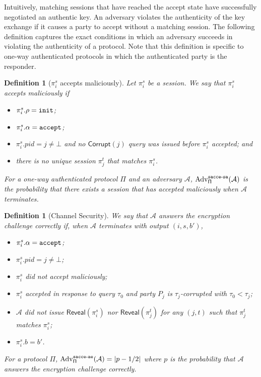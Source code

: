 \documentclass[USenglish,oneside,twocolumn]{article}
\theoremstyle{dgthm}
\theoremstyle{dgdef}
\newtheorem{definition}[theorem]{Definition}
\newcommand{\Protocol}[1]{\operatorname{\mathsf{#1}}}
\newcommand{\abs}[1]{\left\vert#1\right\vert}
\newcommand{\p}[2]{\pi_{#1}^{#2}}
\newcommand{\Oracle}[1]{\mathcal #1}
\newcommand{\Token}[1]{\textnormal{\tt{#1}}}
\newcommand{\init}{\Token{init}}
\newcommand{\accept}{\Token{accept}}
\newcommand{\AdvInt}[1]{\mathsf{#1}}
\newcommand{\Corrupt}{\AdvInt{Corrupt}}
\newcommand{\Reveal}{\AdvInt{Reveal}}
\newcommand{\Experiment}[1]{\operatorname{\tt{#1}}}
\newcommand{\Algorithm}[1]{\mathcal #1}
\newcommand{\AdvName}[2]{\operatorname{\mathrm{Adv}_{\Protocol{#1}}^{\Experiment{#2}}}}
\newcommand{\Adv}[3]{\AdvName{#1}{#2}(\Algorithm{#3})}
\newcommand{\AcceSa}[2]{\Adv{#1}{sacce-sa}{#2}}
\newcommand{\AcceAe}[2]{\Adv{#1}{sacce-ae}{#2}}
\begin{document}
    Intuitively, matching sessions that have reached the accept state have
    successfully negotiated an authentic key. An adversary violates the
    authenticity of the key exchange if it causes a party to accept without
    a matching session. The following definition captures the exact conditions
    in which an adversary succeeds in violating the authenticity of a protocol.
    Note that this definition is specific to one-way authenticated protocols in
    which the authenticated party is the responder.

    \begin{definition}[$\p i s $ accepts maliciously]\label{def:ma}
      Let $\p i s$ be a session. We say that $\p i s$ \emph{accepts maliciously}
      if
      \begin{itemize}
        \item $\p{i}{s}.\rho = \init$;
        \item $\p{i}{s}.\alpha = \accept$;
        \item $\p{i}{s}.pid = j \ne \bot$ and no $\Corrupt(j)$ query was issued before $\p i s$
          accepted; and
        \item there is no unique session $\p j t$ that matches $\p i s$.
      \end{itemize}
     For a one-way authenticated protocol $\Pi$ and an adversary $\Oracle{A}$,
     $\AcceSa{\Pi}{A}$ is the probability that there exists a session that has
     accepted maliciously when $\Oracle{A}$ terminates.
    \end{definition}

    \begin{definition}[Channel Security]\label{def:cs}
      We say that $\Oracle{A}$ \emph{answers the encryption challenge correctly}
      if, when $\Oracle{A}$ terminates with output $(i, s, b')$,
      \begin{itemize}
        \item $\p{i}{s}.\alpha = \accept$;
        \item $\p{i}{s}.pid = j \ne \bot$;
        \item $\p{i}{s}$ did not accept maliciously;
        \item $\p{i}{s}$ accepted in response to query $\tau_0$ and party $P_j$ is $\tau_j$-corrupted with $\tau_0 < \tau_j$;
        \item $\Oracle{A}$ did not issue $\Reveal(\p{i}{s})$ nor $\Reveal(\p{j}{t})$ for any $(j,t)$ such that $\p{j}{t}$ matches $\p{i}{s}$;
        \item $\p{i}{s}.b = b'$.
      \end{itemize}
      For a protocol $\Pi$, $\AcceAe{\Pi}{A} = \abs{p - 1/2}$ where $p$ is the
      probability that $\Oracle{A}$ answers the encryption challenge correctly.
    \end{definition}
\end{document}
